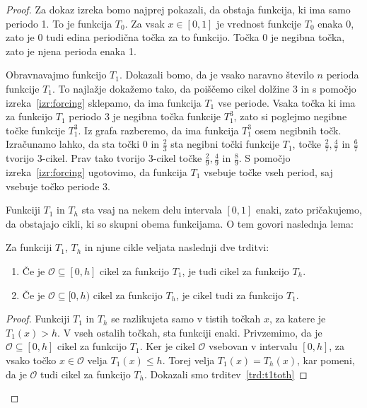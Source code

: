 \documentclass[../TG_magistrsko_delo_sections.tex]{subfiles}
\begin{document}
\begin{proof}
Za dokaz izreka bomo najprej pokazali, da obstaja funkcija, ki ima samo periodo 1. To je funkcija $T_0$. Za vsak $x \in [0, 1]$ je vrednost funkcije $T_0$ enaka 0, zato je 0 tudi edina periodična točka za to funkcijo. Točka 0 je negibna točka, zato je njena perioda enaka 1.

Obravnavajmo funkcijo $T_1$. Dokazali bomo, da je vsako naravno število $n$ perioda funkcije $T_1$. To najlažje dokažemo tako, da poiščemo cikel dolžine 3 in s pomočjo izreka~\ref{izr:forcing} sklepamo, da ima funkcija $T_1$ vse periode. Vsaka točka ki ima za funkcijo $T_1$ periodo 3 je negibna točka funkcije $T_1^3$, zato si poglejmo negibne točke funkcije $T_1^3$. Iz grafa razberemo, da ima funkcija $T_1^3$ osem negibnih točk. Izračunamo lahko, da sta točki 0 in $\frac{2}{3}$ sta negibni točki funkcije $T_1$, točke $\frac{2}{7}, \frac{4}{7}$ in $\frac{6}{7}$ tvorijo 3-cikel. Prav tako tvorijo 3-cikel točke  $\frac{2}{9}, \frac{4}{9}$ in $\frac{8}{9}$. S pomočjo izreka~\ref{izr:forcing} ugotovimo, da funkcija $T_1$ vsebuje točke vseh period, saj vsebuje točko periode 3.

Funkciji $T_1$ in $T_h$ sta vsaj na nekem delu intervala $[0, 1]$ enaki, zato pričakujemo, da obstajajo cikli, ki so skupni obema funkcijama. O tem govori naslednja lema:
\begin{lema}\label{lem:t1th}
Za funkciji $T_1$, $T_h$ in njune cikle  veljata naslednji dve trditvi:
\begin{enumerate}[label={(\arabic*)}]
\item Če je $\mathcal{O} \subseteq [0, h]$ cikel za funkcijo $T_1$, je tudi cikel za funkcijo $T_h$. \label{trd:t1toth}
\item Če je $\mathcal{O} \subseteq [0, h)$ cikel za funkcijo $T_h$, je cikel tudi za funkcijo $T_1$. \label{trd:thtot1}
\end{enumerate}
\end{lema}
\begin{proof}
Funkciji $T_1$ in $T_h$ se razlikujeta samo v tistih točkah $x$, za katere je $T_1(x) > h$. V vseh ostalih točkah, sta funkciji enaki. Privzemimo, da je $\mathcal{O} \subseteq [0, h]$ cikel za funkcijo $T_1$. Ker je cikel $\mathcal{O}$ vsebovan v intervalu $[0, h]$, za vsako točko $x \in \mathcal{O}$ velja $T_1(x) \leq h$. Torej velja $T_1(x)=T_h(x)$, kar pomeni, da je $\mathcal{O}$ tudi cikel za funkcijo $T_h$. Dokazali smo trditev~\ref{trd:t1toth}


\end{proof}
\end{proof}
\end{document}

